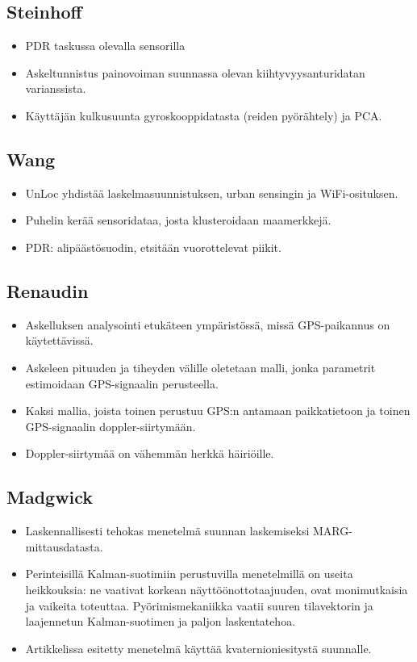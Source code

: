 \documentclass[a4paper]{scrartcl}
\begin{document}
\subsection{Steinhoff\cite{steinhoff2010dead}}
\begin{itemize}
  \item PDR taskussa olevalla sensorilla
  \item Askeltunnistus painovoiman suunnassa olevan kiihtyvyysanturidatan
    varianssista.
  \item Käyttäjän kulkusuunta gyroskooppidatasta (reiden pyörähtely) ja
    PCA.
\end{itemize}

\subsection{Wang\cite{wang2012unsupervised}}
\begin{itemize}
  \item UnLoc yhdistää laskelmasuunnistuksen, urban sensingin ja WiFi-osituksen.
  \item Puhelin kerää sensoridataa, josta klusteroidaan maamerkkejä.
  \item PDR: alipäästösuodin, etsitään vuorottelevat piikit.
\end{itemize}

\subsection{Renaudin\cite{renaudin2013adaptative}}
\begin{itemize}
  \item Askelluksen analysointi etukäteen ympäristössä, missä GPS-paikannus
    on käytettävissä.
  \item Askeleen pituuden ja tiheyden välille oletetaan malli, jonka parametrit
    estimoidaan GPS-signaalin perusteella.
  \item Kaksi mallia, joista toinen perustuu GPS:n antamaan paikkatietoon ja
    toinen GPS-signaalin doppler-siirtymään.
  \item Doppler-siirtymää on vähemmän herkkä häiriöille.
\end{itemize}

\subsection{Madgwick\cite{madgwick2011estimation}}
\begin{itemize}
  \item Laskennallisesti tehokas menetelmä suunnan laskemiseksi MARG-
    mittausdatasta.
  \item Perinteisillä Kalman-suotimiin perustuvilla menetelmillä on
    useita heikkouksia: ne vaativat korkean näyttöönottotaajuuden, ovat
    monimutkaisia ja vaikeita toteuttaa. Pyörimismekaniikka vaatii
    suuren tilavektorin ja laajennetun Kalman-suotimen ja paljon
    laskentatehoa.
  \item Artikkelissa esitetty menetelmä käyttää kvaternioniesitystä suunnalle.
\end{itemize}
\cite{mautz2012indoor}
\end{document}
